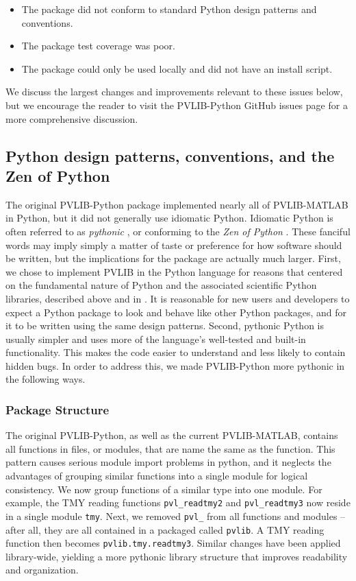 \documentclass[conference]{IEEEtran}
\newcommand{\holmgren}[1]{{\bf\color{red} WH: #1}}
\begin{document}
\begin{itemize}
\item The package did not conform to standard Python design patterns and conventions.
\item The package test coverage was poor. 
\item The package could only be used locally and did not have an install script.
\end{itemize}

We discuss the largest changes and improvements relevant to these issues below, but we encourage the reader to visit the PVLIB-Python GitHub issues page for a more comprehensive discussion.


\subsection{Python design patterns, conventions, and the Zen of Python}

The original PVLIB-Python package implemented nearly all of PVLIB-MATLAB in Python, but it did not generally use idiomatic Python.
Idiomatic Python is often referred to as \emph{pythonic} \cite{pythonic}, or conforming to the \emph{Zen of Python} \cite{zenofpython}. 
These fanciful words may imply simply a matter of taste or preference for how software should be written, but the implications for the package are actually much larger.
First, we chose to implement PVLIB in the Python language for reasons that centered on the fundamental nature of Python and the associated scientific Python libraries, described above and in \cite{andrews}. 
It is reasonable for new users and developers to expect a Python package to look and behave like other Python packages, and for it to be written using the same design patterns.
Second, pythonic Python is usually simpler and uses more of the language's well-tested and built-in functionality.
This makes the code easier to understand and less likely to contain hidden bugs.
In order to address this, we made PVLIB-Python more pythonic in the following ways.

\subsubsection{Package Structure} 
The original PVLIB-Python, as well as the current PVLIB-MATLAB, contains all functions in files, or modules, that are name the same as the function. 
This pattern causes serious module import problems in python, and it neglects the advantages of grouping similar functions into a single module for logical consistency.
We now group functions of a similar type into one module. 
For example, the TMY reading functions \texttt{pvl{\_}readtmy2} and \texttt{pvl{\_}readtmy3} now reside in a single module \texttt{tmy}. 
Next, we removed \texttt{pvl{\_}} from all functions and modules -- after all, they are all contained in a packaged called \texttt{pvlib}. 
A TMY reading function then becomes \texttt{pvlib.tmy.readtmy3}. 
Similar changes have been applied library-wide, yielding a more pythonic library structure that improves readability and organization. 
\end{document}
